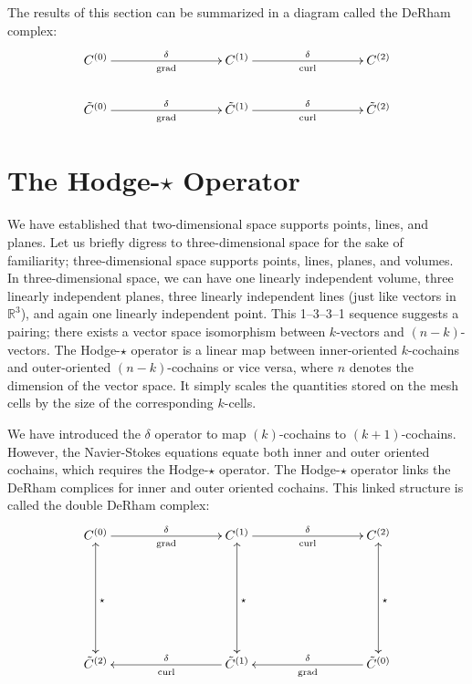 The results of this section can be summarized in a diagram called the DeRham complex:
\begin{equation}
    \begin{gathered}
        \xymatrix@C=20ex{
            C^{(0)} \ar[r]^{\delta}_{\text{grad}} & C^{(1)} \ar[r]^{\delta}_{\text{curl}} & C^{(2)} \\
            \tilde{C}^{(0)} \ar[r]^{\delta}_{\text{grad}} & \tilde{C}^{(1)} \ar[r]^{\delta}_{\text{curl}} & \tilde{C}^{(2)}
        }
    \end{gathered}
\end{equation}

\section{The Hodge-$\star$ Operator}

We have established that two-dimensional space supports points, lines, and planes. Let us briefly digress to three-dimensional space for the sake of familiarity; three-dimensional space supports points, lines, planes, and volumes. In three-dimensional space, we can have one linearly independent volume, three linearly independent planes, three linearly independent lines (just like vectors in $\mathbb{R}^3$), and again one linearly independent point. This 1--3--3--1 sequence suggests a pairing; there exists a vector space isomorphism between $k$-vectors and $(n-k)$-vectors. The Hodge-$\star$ operator is a linear map between inner-oriented $k$-cochains and outer-oriented $(n-k)$-cochains or vice versa, where $n$ denotes the dimension of the vector space. It simply scales the quantities stored on the mesh cells by the size of the corresponding $k$-cells.

We have introduced the $\delta$ operator to map $(k)$-cochains to $(k+1)$-cochains. However, the Navier-Stokes equations equate both inner and outer oriented cochains, which requires the Hodge-$\star$ operator. The Hodge-$\star$ operator links the DeRham complices for inner and outer oriented cochains. This linked structure is called the double DeRham complex:
\begin{equation}
    \begin{gathered}
        \xymatrix@=20ex{
            C^{(0)} \ar[r]^{\delta}_{\text{grad}} \ar@{<->}[d]^{\star} & C^{(1)} \ar[r]^{\delta}_{\text{curl}} \ar@{<->}[d]^{\star} & C^{(2)} \ar@{<->}[d]^{\star} \\
            \tilde{C}^{(2)} & \tilde{C}^{(1)} \ar[l]_{\delta}^{\text{curl}} & \tilde{C}^{(0)} \ar[l]_{\delta}^{\text{grad}}
        }
    \end{gathered}
    \label{eq:doubleDeRham}
\end{equation}

